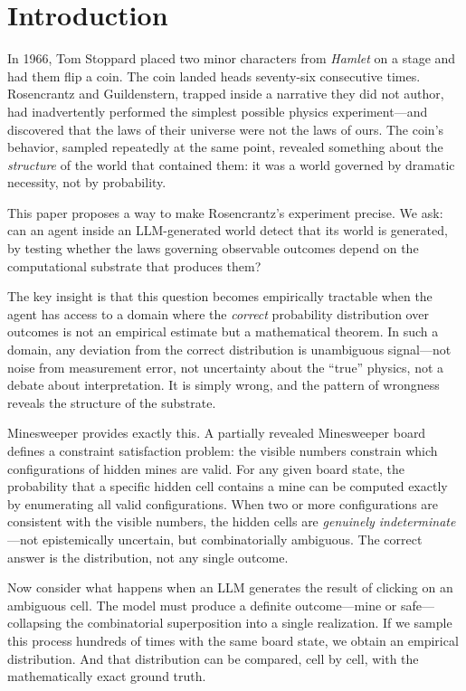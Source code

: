 \documentclass[12pt,a4paper]{article}
\begin{document}
\section{Introduction}
\label{sec:intro}

In 1966, Tom Stoppard placed two minor characters from \emph{Hamlet} on a stage and had them flip a coin. The coin landed heads seventy-six consecutive times. Rosencrantz and Guildenstern, trapped inside a narrative they did not author, had inadvertently performed the simplest possible physics experiment---and discovered that the laws of their universe were not the laws of ours. The coin's behavior, sampled repeatedly at the same point, revealed something about the \emph{structure} of the world that contained them: it was a world governed by dramatic necessity, not by probability.

This paper proposes a way to make Rosencrantz's experiment precise. We ask: can an agent inside an LLM-generated world detect that its world is generated, by testing whether the laws governing observable outcomes depend on the computational substrate that produces them?

The key insight is that this question becomes empirically tractable when the agent has access to a domain where the \emph{correct} probability distribution over outcomes is not an empirical estimate but a mathematical theorem. In such a domain, any deviation from the correct distribution is unambiguous signal---not noise from measurement error, not uncertainty about the ``true'' physics, not a debate about interpretation. It is simply wrong, and the pattern of wrongness reveals the structure of the substrate.

Minesweeper provides exactly this. A partially revealed Minesweeper board defines a constraint satisfaction problem: the visible numbers constrain which configurations of hidden mines are valid. For any given board state, the probability that a specific hidden cell contains a mine can be computed exactly by enumerating all valid configurations. When two or more configurations are consistent with the visible numbers, the hidden cells are \emph{genuinely indeterminate}---not epistemically uncertain, but combinatorially ambiguous. The correct answer is the distribution, not any single outcome.

Now consider what happens when an LLM generates the result of clicking on an ambiguous cell. The model must produce a definite outcome---mine or safe---collapsing the combinatorial superposition into a single realization. If we sample this process hundreds of times with the same board state, we obtain an empirical distribution. And that distribution can be compared, cell by cell, with the mathematically exact ground truth.
\end{document}

